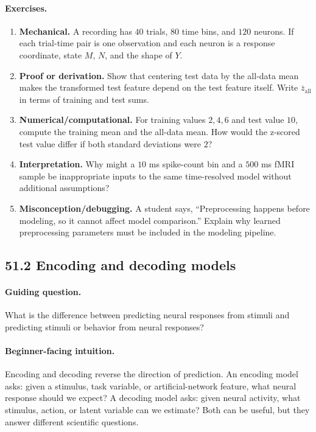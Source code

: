 \paragraph{Exercises.}
\begin{enumerate}[label=\textbf{51.1.\arabic*.}, leftmargin=*]
\item \textbf{Mechanical.} A recording has \(40\) trials, \(80\) time bins, and \(120\) neurons. If each trial-time pair is one observation and each neuron is a response coordinate, state \(M\), \(N\), and the shape of \(Y\).
\item \textbf{Proof or derivation.} Show that centering test data by the all-data mean makes the transformed test feature depend on the test feature itself. Write \(\bar z_{\mathrm{all}}\) in terms of training and test sums.
\item \textbf{Numerical/computational.} For training values \(2,4,6\) and test value \(10\), compute the training mean and the all-data mean. How would the z-scored test value differ if both standard deviations were \(2\)?
\item \textbf{Interpretation.} Why might a \(10\) ms spike-count bin and a \(500\) ms fMRI sample be inappropriate inputs to the same time-resolved model without additional assumptions?
\item \textbf{Misconception/debugging.} A student says, ``Preprocessing happens before modeling, so it cannot affect model comparison.'' Explain why learned preprocessing parameters must be included in the modeling pipeline.
\end{enumerate}

\subsection{51.2 Encoding and decoding models}

\paragraph{Guiding question.}
What is the difference between predicting neural responses from stimuli and predicting stimuli or behavior from neural responses?

\paragraph{Beginner-facing intuition.}
Encoding and decoding reverse the direction of prediction. An encoding model asks: given a stimulus, task variable, or artificial-network feature, what neural response should we expect? A decoding model asks: given neural activity, what stimulus, action, or latent variable can we estimate? Both can be useful, but they answer different scientific questions.

